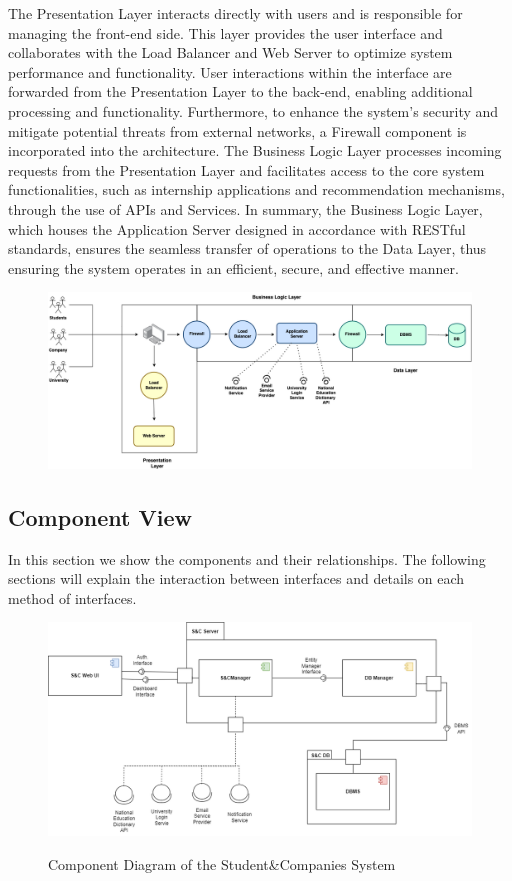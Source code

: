\documentclass[a4paper,12pt]{article}
\begin{document}
 The Presentation Layer interacts directly with users and is responsible for managing the front-end side. This layer provides the user interface and collaborates with the Load Balancer and Web Server to optimize system performance and functionality. User interactions within the interface are forwarded from the Presentation Layer to the back-end, enabling additional processing and functionality. Furthermore, to enhance the system’s security and mitigate potential threats from external networks, a Firewall component is incorporated into the architecture. The Business Logic Layer processes incoming requests from the Presentation Layer and facilitates access to the core system functionalities, such as internship applications and recommendation mechanisms, through the use of APIs and Services. In summary, the Business Logic Layer, which houses the Application Server designed in accordance with RESTful standards, ensures the seamless transfer of operations to the Data Layer, thus ensuring the system operates in an efficient, secure, and effective manner.
\begin{figure}[H]
\centering
\includegraphics[scale = 0.40]{DD_figures/SingleDiagrams/overviewDiagram.png}
\end{figure}
\subsection{Component View}
In this section we show the components and their relationships. The following
sections will explain the interaction between interfaces and details on each method of interfaces.
\begin{figure}[H]
\centering
\includegraphics[scale = 0.50]{DD_figures/GeneralComponentDiagram.drawio.png}\\
\caption{Component Diagram of the Student\&Companies System}
\end{figure}
\end{document}
